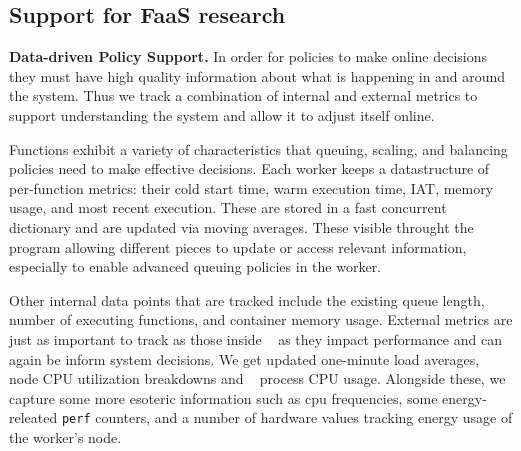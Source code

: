 



\subsection{Support for FaaS research}


\noindent \textbf{Data-driven Policy Support.} \label{sec:data-support}
In order for policies to make online decisions they must have high quality information about what is happening in and around the system.
Thus we track a combination of internal and external metrics to support understanding the system and allow it to adjust itself online.

Functions exhibit a variety of characteristics that queuing, scaling, and balancing policies need to make effective decisions.
Each worker keeps a datastructure of per-function metrics: their cold start time, warm execution time, IAT, memory usage, and most recent execution.
These are stored in a fast concurrent dictionary and are updated via moving averages.
These visible throught the program allowing different pieces to update or access relevant information, especially to enable advanced queuing policies in the worker.

Other internal data points that are tracked include the existing queue length, number of executing functions, and container memory usage.
External metrics are just as important to track as those inside \sysname~ as they impact performance and can again be inform system decisions.
We get updated one-minute load averages, node CPU utilization breakdowns and \sysname~ process CPU usage.
Alongside these, we capture some more esoteric information such as cpu frequencies, some energy-releated \texttt{perf} counters, and a number of hardware values tracking energy usage of the worker's node.

